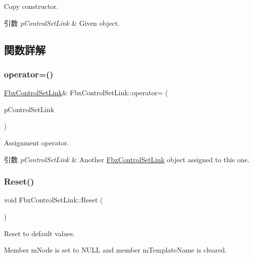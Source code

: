 Copy constructor. 
\begin{DoxyParams}{引数}
{\em p\+Control\+Set\+Link} & Given object. \\
\hline
\end{DoxyParams}


\subsection{関数詳解}
\mbox{\label{class_fbx_control_set_link_a32de9712bee72685b7447aa23b35bec7}} 
\subsubsection{\texorpdfstring{operator=()}{operator=()}}
{\footnotesize\ttfamily \hyperlink{class_fbx_control_set_link}{Fbx\+Control\+Set\+Link}\& Fbx\+Control\+Set\+Link\+::operator= (\begin{DoxyParamCaption}\item[{const \hyperlink{class_fbx_control_set_link}{Fbx\+Control\+Set\+Link} \&}]{p\+Control\+Set\+Link }\end{DoxyParamCaption})}

Assignment operator. 
\begin{DoxyParams}{引数}
{\em p\+Control\+Set\+Link} & Another \hyperlink{class_fbx_control_set_link}{Fbx\+Control\+Set\+Link} object assigned to this one. \\
\hline
\end{DoxyParams}
\mbox{\label{class_fbx_control_set_link_afedadf6bb18a836a2470636eda93ece9}} 
\subsubsection{\texorpdfstring{Reset()}{Reset()}}
{\footnotesize\ttfamily void Fbx\+Control\+Set\+Link\+::\+Reset (\begin{DoxyParamCaption}{ }\end{DoxyParamCaption})}

Reset to default values.

Member m\+Node is set to {\ttfamily N\+U\+LL} and member m\+Template\+Name is cleared. 

